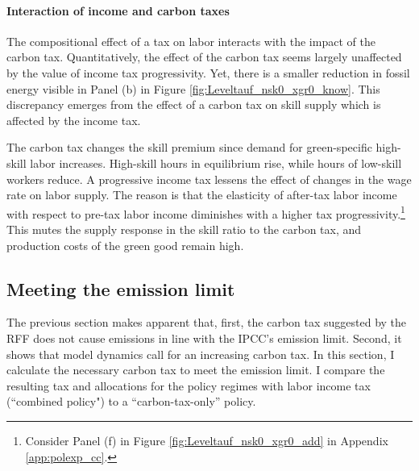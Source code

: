 \paragraph{Interaction of income and carbon taxes}
The compositional effect of a tax on labor interacts with the impact of the carbon tax.
Quantitatively, the effect of the carbon tax seems largely unaffected by the value of income tax progressivity.
Yet, there is a smaller reduction in fossil energy visible in Panel (b) in Figure \ref{fig:Leveltauf_nsk0_xgr0_know}.
This discrepancy emerges from the effect of a carbon tax on skill supply which is affected by the income tax. 

The carbon tax changes the skill premium since demand for green-specific high-skill labor increases. High-skill hours in equilibrium rise, while hours of low-skill workers reduce.  A progressive income tax lessens the effect of changes in the wage rate on labor supply. The reason is that the elasticity of after-tax labor income with respect to pre-tax labor income diminishes with a higher tax progressivity.\footnote{ Consider Panel (f) in Figure \ref{fig:Leveltauf_nsk0_xgr0_add} in Appendix \ref{app:polexp_cc}.} This mutes the supply response in the skill ratio to the carbon tax, and production costs of the green good remain high.


\subsection{Meeting the emission limit}\label{subsec:meetlim}

The previous section makes apparent that, first, the carbon tax suggested by the RFF does not cause emissions in line with the IPCC's emission limit.  Second, it shows that model dynamics call for an increasing carbon tax. In this section, I calculate the necessary carbon tax to meet the emission limit. I compare the resulting tax and allocations for the policy regimes with labor income tax (``combined policy") to a ``carbon-tax-only'' policy.


